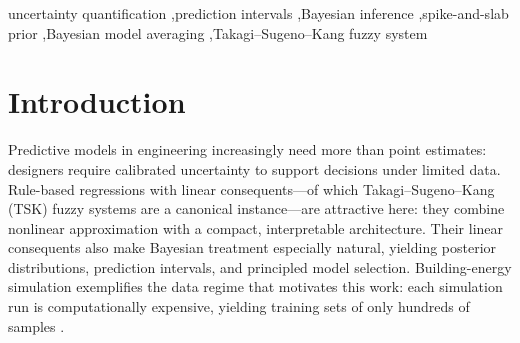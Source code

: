\documentclass[review,1p,times]{elsarticle}
\begin{document}
\begin{frontmatter}
\begin{keyword}
uncertainty quantification \sep prediction intervals \sep Bayesian inference \sep spike-and-slab prior \sep Bayesian model averaging \sep Takagi--Sugeno--Kang fuzzy system
\end{keyword}

\end{frontmatter}

\maketitle

\section{Introduction}
\label{sec:introduction}

Predictive models in engineering increasingly need more than point estimates: designers require calibrated uncertainty to support decisions under limited data.
Rule-based regressions with linear consequents---of which Takagi--Sugeno--Kang (TSK) fuzzy systems \cite{takagi1985fuzzy} are a canonical instance---are attractive here: they combine nonlinear approximation with a compact, interpretable architecture.
Their linear consequents also make Bayesian treatment especially natural, yielding posterior distributions, prediction intervals, and principled model selection. Building-energy simulation exemplifies the data regime that motivates this work: each simulation run is computationally expensive, yielding training sets of only hundreds of samples \cite{tsanas2012accurate,heliyon2024early}.
\end{document}
